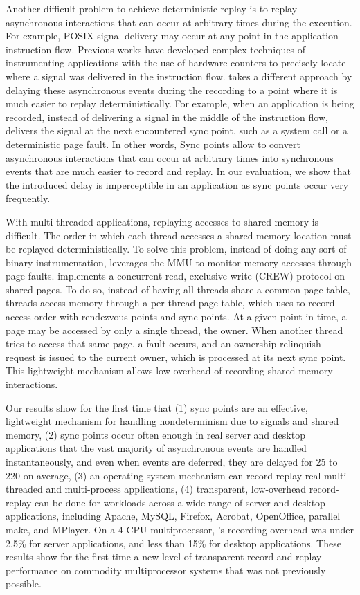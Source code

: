 Another difficult problem to achieve deterministic replay is to replay
asynchronous interactions that can occur at arbitrary times during the
execution. For example, POSIX signal delivery may occur at any point in the
application instruction flow. Previous works have developed complex techniques
of instrumenting applications with the use of hardware counters to precisely
locate where a signal was delivered in the instruction flow.
\scribe takes a different approach by delaying these asynchronous events
during the recording to a point where it is much easier to replay
deterministically. For example, when an application is being recorded,
instead of delivering a signal in the middle of the instruction flow, \scribe
delivers the signal at the next encountered sync point, such as a system call or
a deterministic page fault. In other words,
Sync points allow \scribe to convert asynchronous interactions that can occur at
arbitrary times into synchronous events that are much easier to record and
replay. In our evaluation, we show that the introduced delay is imperceptible
in an application as sync points occur very frequently.

With multi-threaded applications, replaying accesses to shared memory is
difficult. The order in which each thread accesses a shared memory location must
be replayed deterministically. To solve this problem, instead of doing any sort
of binary instrumentation, \scribe leverages the MMU to monitor memory accesses
through page faults. \scribe implements a concurrent read, exclusive write
(CREW) protocol on shared pages. To do so, instead of having all threads share a
common page table, threads access memory through a per-thread page table, which
\scribe uses to record access order with rendezvous points and sync points.
At a given point in time, a page may be accessed by only a single thread, the
owner. When another thread tries to access that same page, a fault occurs,
and an ownership relinquish request is issued to the current owner, which is
processed at its next sync point. This lightweight mechanism allows low
overhead of recording shared memory interactions.

Our results show for the first time that (1) sync points are an effective,
lightweight mechanism for handling nondeterminism due to signals and shared
memory, (2) sync points occur often enough in real server and desktop
applications that the vast majority of asynchronous events are handled
instantaneously, and even when events are deferred, they are delayed for 25 to
220\us{} on average, (3) an operating system mechanism can record-replay real
multi-threaded and multi-process applications, (4) transparent, low-overhead
record-replay can be done for workloads across a wide range of server and
desktop applications, including Apache, MySQL, Firefox, Acrobat, OpenOffice,
parallel make, and MPlayer.  On a 4-CPU multiprocessor, \scribe{}'s recording
overhead was under 2.5\% for server applications, and less than 15\% for desktop
applications.  These results show for the first time a new level of transparent
record and replay performance on commodity multiprocessor systems that was not
previously possible. 

